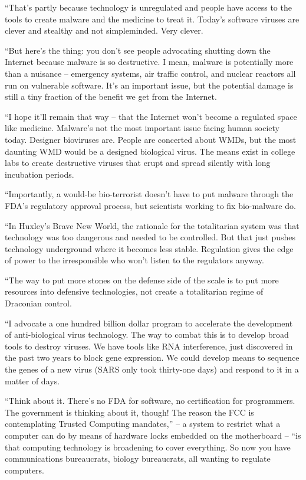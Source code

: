 ``That's partly because technology is unregulated and people have
access to the tools to create malware and the medicine to treat it.
Today's software viruses are clever and stealthy and not
simpleminded. Very clever.

``But here's the thing: you don't see people advocating shutting
down the Internet because malware is so destructive. I mean,
malware is potentially more than a nuisance -- emergency systems,
air traffic control, and nuclear reactors all run on vulnerable
software. It's an important issue, but the potential damage is
still a tiny fraction of the benefit we get from the Internet.

``I hope it'll remain that way -- that the Internet won't become a
regulated space like medicine. Malware's not the most important
issue facing human society today. Designer bioviruses are. People
are concerted about WMDs, but the most daunting WMD would be a
designed biological virus. The means exist in college labs to
create destructive viruses that erupt and spread silently with long
incubation periods.

``Importantly, a would-be bio-terrorist doesn't have to put malware
through the FDA's regulatory approval process, but scientists
working to fix bio-malware do.

``In Huxley's Brave New World, the rationale for the totalitarian
system was that technology was too dangerous and needed to be
controlled. But that just pushes technology underground where it
becomes less stable. Regulation gives the edge of power to the
irresponsible who won't listen to the regulators anyway.

``The way to put more stones on the defense side of the scale is to
put more resources into defensive technologies, not create a
totalitarian regime of Draconian control.

``I advocate a one hundred billion dollar program to accelerate the
development of anti-biological virus technology. The way to combat
this is to develop broad tools to destroy viruses. We have tools
like RNA interference, just discovered in the past two years to
block gene expression. We could develop means to sequence the genes
of a new virus (SARS only took thirty-one days) and respond to it
in a matter of days.

``Think about it. There's no FDA for software, no certification for
programmers. The government is thinking about it, though! The
reason the FCC is contemplating Trusted Computing mandates,'' -- a
system to restrict what a computer can do by means of hardware
locks embedded on the motherboard -- ``is that computing technology
is broadening to cover everything. So now you have communications
bureaucrats, biology bureaucrats, all wanting to regulate
computers.

